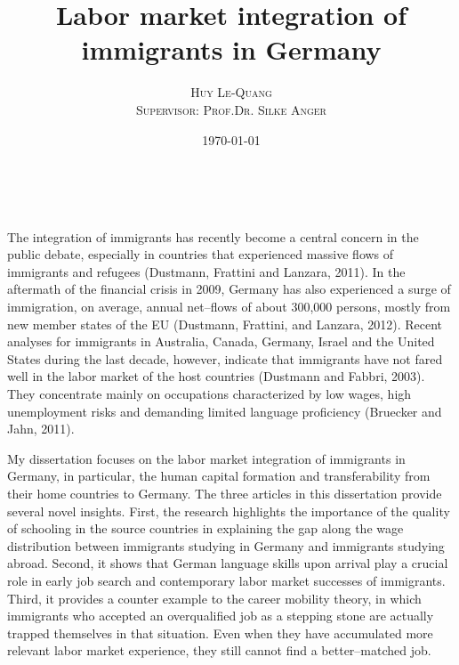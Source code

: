 \documentclass[a4paper, 11pt]{article} %
\title{\textbf{Labor market integration of immigrants in Germany}}
\author{\textsc{Huy Le-Quang} %
\\{\textsc{Supervisor: Prof.Dr. Silke Anger}}} %
\date{\today} %
\makeatletter
\renewcommand{\maketitle}{ %
\begin{center} %
{\LARGE\@title} %

\vspace{15pt} %

{\large\@author} %
\\\@date %

\vspace{12pt} %
\end{center}
}
\makeatother
\begin{document}
\maketitle %





The integration of immigrants has recently become a central concern in the public debate, especially in countries that experienced massive flows of immigrants and refugees (Dustmann, Frattini and Lanzara, 2011). In the aftermath of the financial crisis in 2009, Germany has also experienced a surge of immigration, on average, annual net--flows of about 300,000 persons, mostly from new member states of the EU (Dustmann, Frattini, and Lanzara, 2012). Recent analyses for immigrants in Australia, Canada, Germany, Israel and the United States during the last decade, however, indicate that immigrants have not fared well in the labor market of the host countries (Dustmann and Fabbri, 2003). They concentrate mainly on occupations characterized by low wages, high unemployment risks and demanding limited language proficiency (Bruecker and Jahn, 2011).

My dissertation focuses on the labor market integration of immigrants in Germany, in particular, the human capital formation and transferability from their home countries to Germany. The three articles in this dissertation provide several novel insights. First, the research highlights the importance of the quality of schooling in the source countries in explaining the gap along the wage distribution between immigrants studying in Germany and immigrants studying abroad. Second, it shows that German language skills upon arrival play a crucial role in early job search and contemporary labor market successes of immigrants. Third, it provides a counter example to the career mobility theory, in which immigrants who accepted an overqualified job as a stepping stone are actually trapped themselves in that situation. Even when they have accumulated more relevant labor market experience, they still cannot find a better--matched job.
\end{document}
